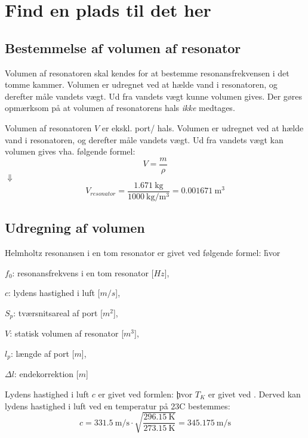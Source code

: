 \chapter{Find en plads til det her}

\section{Bestemmelse af volumen af resonator}

Volumen af resonatoren skal kendes for at bestemme resonansfrekvensen i det tomme kammer. Volumen er udregnet ved at hælde vand i resonatoren, og derefter måle vandets vægt. Ud fra vandets vægt kunne volumen gives. Der gøres opmærksom på at volumen af resonatorens hals \textit{ikke} medtages. 

Volumen af resonatoren $V$ er ekskl. port/ hals. Volumen er udregnet ved at hælde vand i resonatoren, og derefter måle vandets vægt. Ud fra vandets vægt kan volumen gives vha. følgende formel:  
\begin{equation}
  V=\frac{m}{\rho}
  \label{eq:vformel}
\end{equation}
$\Downarrow$
\begin{equation}
V_{resonator}=\frac{\SI{1,671}{\kilo\gram}}{\SI{1000}{\kilo \gram \per \meter^{3}}}={\SI{0,001671}{\meter^{3}}}
\end{equation}


\section{Udregning af volumen}

Helmholtz resonansen i en tom resonator er givet ved følgende formel: \f

hvor 
\begin{description}[align=left, labelwidth=1in,labelindent=0.5cm]
\item $f_{0}$: resonansfrekvens i en tom resonator [$Hz$],\\
\item $c$: lydens hastighed i luft [$m/s$],\\
\item $S_{p}$: tværsnitsareal af port [$m^2$],\\
\item $V$: statisk volumen af resonator [$m^3$],\\
\item $l_{p}$: længde af port [$m$],\\
\item $\Delta l$: endekorrektion [$m$]\\
\end{description}
Lydens hastighed i luft $c$ er givet ved formlen: 
\c
hvor $T_{K}$ er givet ved \T. 
Derved kan lydens hastighed i luft ved en temperatur på 23\degree C bestemmes: 
\begin{equation}
		c = {\SI{331,5}{\meter / \second}} \cdot
		\sqrt{\frac{\SI{296,15}{\kelvin}}{\SI{273,15}{\kelvin}}} = {\SI{345,175}{\meter / \second}} 	\end{equation}
		
